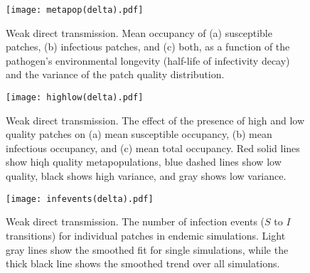 \documentclass{svjour3}
\begin{document}
\begin{figure}[h!]
\centering
\texttt{[image: metapop(delta).pdf]}
\caption{Weak direct transmission.  Mean occupancy of (a) susceptible patches, (b) infectious patches, and (c) both, as a function of the pathogen's environmental longevity (half-life of infectivity decay) and the variance of the patch quality distribution.}
\label{poutcome_delta}
\end{figure}   

\begin{figure}
\centering
\texttt{[image: highlow(delta).pdf]}
\caption{Weak direct transmission.  The effect of the presence of high and low quality patches on (a) mean susceptible occupancy, (b) mean infectious occupancy, and (c) mean total occupancy.  Red solid lines show hiqh quality metapopulations, blue dashed lines show low quality, black shows high variance, and gray shows low variance.}
\label{sens_delta}
\end{figure}

\begin{figure}
\centering
\texttt{[image: infevents(delta).pdf]}
\caption{Weak direct transmission.  The number of infection events ($S$ to $I$ transitions) for individual patches in endemic simulations.  Light gray lines show the smoothed fit for single simulations, while the thick black line shows the smoothed trend over all simulations.}
\label{infections_delta}
\end{figure}

\clearpage

     
\end{document}
